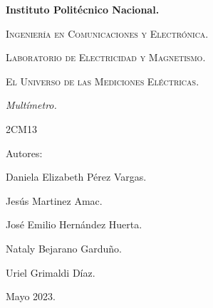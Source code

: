 \documentclass[10pt]{article}
\begin{document}
\pagestyle{fancy}
\cfoot{}


\lhead{}

\begin{titlepage}

	\begin{figure}[t]
		\hspace{0.6\textwidth}
	\end{figure}

	\centering
	{\bfseries\Huge Instituto Politécnico Nacional. \par}
	\vspace{1cm}
	{\scshape\Large Ingeniería en Comunicaciones y Electrónica. \par}
	\vspace{0.3cm}
	{\scshape\Large Laboratorio de Electricidad y Magnetismo.  \par}
	\vspace{1cm}
	{\scshape\Huge El Universo de las Mediciones Eléctricas. \par}
	\vspace{1cm}
	{\itshape\Large Multímetro. \par}
	{\Large 2CM13\par}
	\vfill
	{\Large Autores: \par}
	{\Large Daniela Elizabeth Pérez Vargas. \par}
	{\Large Jesús Martinez Amac. \par}
	{\Large José Emilio Hernández Huerta. \par}
	{\Large Nataly Bejarano Garduño.\par}
	{\Large Uriel Grimaldi Díaz.  \par}
	\vfill
	{\Large Mayo 2023. \par}

\end{titlepage}
\end{document}
